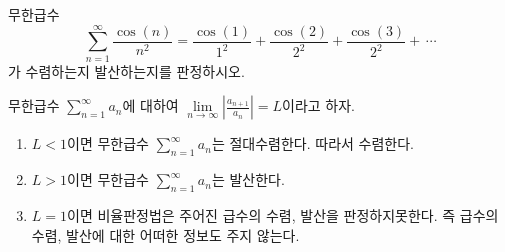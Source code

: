 \documentclass[11pt, a4paper]{book}
\begin{document}
\begin{problem}
	무한급수
	\begin{equation*}
		\sum_{n=1}^{\infty}\frac{\cos(n)}{n^{2}} = \frac{\cos(1)}{1^2} +\frac{\cos(2)}{2^2} + \frac{\cos(3)}{2^{2}} + \, \cdots
	\end{equation*}
가 수렴하는지 발산하는지를 판정하시오.
\end{problem}
\vspace{1em}

\begin{theorem}[비율판정법]
	무한급수 $\displaystyle \sum_{n=1}^{\infty}a_{n}$에 대하여 $\displaystyle \lim\limits_{n\to \infty}\left|\frac{a_{n+1}}{a_{n}}\right| =L$이라고 하자.
\begin{enumerate}[label=(\arabic*)]
	\item $L<1$이면 무한급수 $\displaystyle \sum_{n=1}^{\infty}a_{n}$는  절대수렴한다. 따라서 수렴한다.
	\item $L>1$이면 무한급수 $\displaystyle \sum_{n=1}^{\infty}a_{n}$는 발산한다.
	\item $L=1$이면 비율판정법은 주어진 급수의 수렴, 발산을 판정하지못한다. 즉 급수의 수렴, 발산에 대한 어떠한 정보도 주지 않는다.
\end{enumerate}
\end{theorem}
\end{document}

